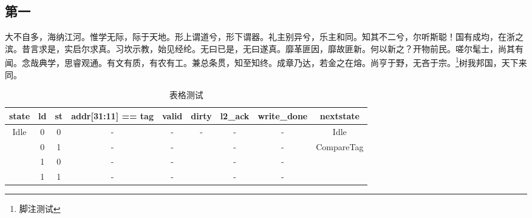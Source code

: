 \documentclass{source/Report}
\begin{document}
            \subsection{第一}
            大不自多，海纳江河。惟学无际，际于天地。形上谓道兮，形下谓器。礼主别异兮，乐主和同。知其不二兮，尔听斯聪！国有成均，在浙之滨。昔言求是，实启尔求真。习坎示教，始见经纶。无曰已是，无曰遂真。靡革匪因，靡故匪新。何以新之？开物前民。嗟尔髦士，尚其有闻。念哉典学，思睿观通。有文有质，有农有工。兼总条贯，知至知终。成章乃达，若金之在熔。尚亨于野，无吝于宗。\footnote{脚注测试}树我邦国，天下来同。
            \begin{table}[H]
                \centering
                \caption{表格测试}
                \begin{tabular}{|c|c|c|c|c|c|c|c|c|}
                \hline
                state                 & ld & st & addr{[}31:11{]} == tag & valid & dirty & l2\_ack & write\_done & nextstate                   \\ \hline
                \multirow{4}{*}{Idle} & 0  & 0  & -                      & -     & -     & -       & -           & Idle                        \\ \cline{2-9} 
                                    & 0  & 1  & -                      & -     &       & -       & -           & \multirow{3}{*}{CompareTag} \\ \cline{2-8}
                                    & 1  & 0  & -                      & -     &       & -       & -           &                             \\ \cline{2-8}
                                    & 1  & 1  & -                      & -     &       & -       & -           &                             \\ \hline
            \end{tabular}
            \end{table}
\end{document}
